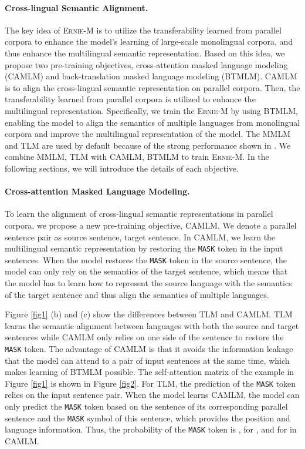 \documentclass[11pt]{article}
\begin{document}
\paragraph{Cross-lingual Semantic Alignment.}
The key idea of \textsc{Ernie-M} is to utilize the transferability learned from parallel corpora to enhance the model's learning of large-scale monolingual corpora, and thus enhance the multilingual semantic representation. Based on this idea, we propose two pre-training objectives, cross-attention masked language modeling (CAMLM) and back-translation masked language modeling (BTMLM). 
CAMLM is to align the cross-lingual semantic representation on parallel corpora. 
Then, the transferability learned from parallel corpora is utilized to enhance the multilingual representation. Specifically, we train the \textsc{Ernie-M} by using BTMLM, enabling the model to align the semantics of multiple languages from monolingual corpora and improve the multilingual representation of the model. 
The MMLM and TLM are used by default because of the strong performance shown in \citealt{lample2019cross}. 
We combine MMLM, TLM with CAMLM, BTMLM to train \textsc{Ernie-M}. In the following sections, we will introduce the details of each objective.

\paragraph{Cross-attention Masked Language Modeling.} To learn the alignment of cross-lingual semantic representations in parallel corpora, we propose a new pre-training objective, CAMLM.
We denote a parallel sentence pair as source sentence, target sentence. In CAMLM, we learn the multilingual semantic representation by restoring the \texttt{MASK} token in the input sentences. When the model restores the \texttt{MASK} token in the source sentence, the model can only rely on the semantics of the target sentence, which means that the model has to learn how to represent the source language with the semantics of the target sentence and thus align the semantics of multiple languages.

Figure \ref{fig1} (b) and (c) show the differences between TLM \cite{lample2019cross} and CAMLM. TLM learns the semantic alignment between languages with both the source and target sentences while CAMLM only relies on one side of the sentence to restore the \texttt{MASK} token. The advantage of CAMLM is that it avoids the information leakage that the model can attend to a  pair of input sentences at the same time, which makes learning of BTMLM  possible. The self-attention matrix of the example in Figure \ref{fig1} is shown in Figure \ref{fig2}. For TLM, the prediction of the \texttt{MASK} token relies on the input sentence pair. When the model learns CAMLM, the model can only predict the \texttt{MASK} token based on the sentence of its corresponding parallel sentence and the \texttt{MASK} symbol of this sentence, which provides the position and language information. Thus, the probability of the \texttt{MASK} token  is ,  for , and  for  in CAMLM.
\end{document}
